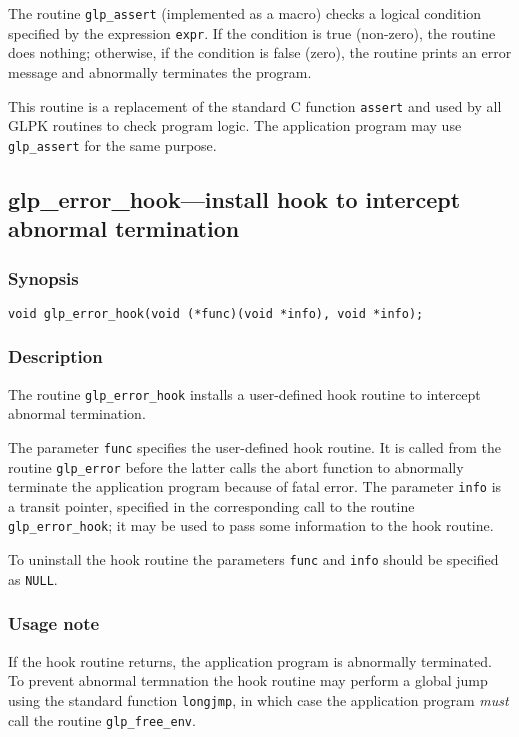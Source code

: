 The routine \verb|glp_assert| (implemented as a macro) checks
a logical condition specified by the expression \verb|expr|. If the
condition is true (non-zero), the routine does nothing; otherwise, if
the condition is false (zero), the routine prints an error message and
abnormally terminates the program.

This routine is a replacement of the standard C function \verb|assert|
and used by all GLPK routines to check program logic. The application
program may use \verb|glp_assert| for the same purpose.

\subsection{glp\_error\_hook---install hook to intercept abnormal
termination}

\subsubsection*{Synopsis}

\begin{verbatim}
void glp_error_hook(void (*func)(void *info), void *info);
\end{verbatim}

\subsubsection*{Description}

The routine \verb|glp_error_hook| installs a user-defined hook routine
to intercept abnormal termination.

The parameter \verb|func| specifies the user-defined hook routine. It
is called from the routine \verb|glp_error| before the latter calls the
abort function to abnormally terminate the application program because
of fatal error. The parameter \verb|info| is a transit pointer,
specified in the corresponding call to the routine
\verb|glp_error_hook|; it may be used to pass some information to the
hook routine.

To uninstall the hook routine the parameters \verb|func| and \verb|info|
should be specified as \verb|NULL|.

\subsubsection*{Usage note}

If the hook routine returns, the application program is abnormally
terminated. To prevent abnormal termnation the hook routine may perform
a global jump using the standard function \verb|longjmp|, in which case
the application program {\it must} call the routine \verb|glp_free_env|.

